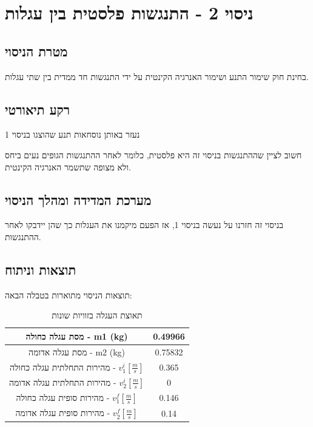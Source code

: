 \documentclass[14pt]{extarticle}
\begin{document}
\section*{ניסוי 2 - התנגשות פלסטית בין עגלות}
\subsection*{מטרת הניסוי}
בחינת חוק שימור התנע ושימור האנרגיה הקינטית על ידי התנגשות חד ממדית בין שתי עגלות.
\subsection*{רקע תיאורטי}
נעזר באותן נוסחאות תנע שהוצגו בניסוי 1

חשוב לציין שההתנגשות בניסוי זה היא פלסטית, כלומר לאחר ההתנגשות הגופים נעים ביחס ולא מצופה שתשמר האנרגיה הקינטית.

\subsection*{מערכת המדידה ומהלך הניסוי}
בניסוי זה חזרנו על נעשה בניסוי 1, אז  הפעם מיקמנו את העגלות כך שהן יידבקו לאחר ההתנגשות.

\subsection*{תוצאות וניתוח}

תוצאות הניסוי מתוארות בטבלה הבאה:

\begin{table}[H]
    \centering
    \renewcommand{\arraystretch}{1.5} %
    \begin{tabular}{|c|c|}
        \hline
        מסת עגלה כחולה - m1 (kg)                            & 0.49966 \\
        \hline
        מסת עגלה אדומה - m2 (kg)                            & 0.75832 \\
        \hline
        מהירות התחלתית עגלה כחולה - $v_{1}^i [\frac{m}{s}]$ & 0.365   \\
        \hline
        מהירות התחלתית עגלה אדומה - $v_{2}^i [\frac{m}{s}]$ & 0       \\
        \hline
        מהירות סופית עגלה כחולה - $v_{1}^f [\frac{m}{s}]$   & 0.146   \\
        \hline
        מהירות סופית עגלה אדומה - $v_{2}^f [\frac{m}{s}]$   & 0.14    \\
        \hline
    \end{tabular}
    \caption{תאוצת העגלה בזוויות שונות}
\end{table}
\end{document}
